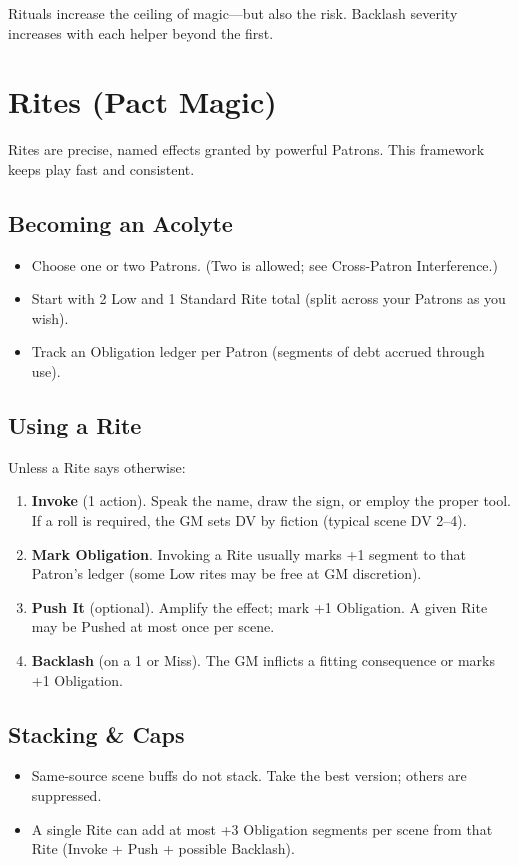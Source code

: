 Rituals increase the ceiling of magic—but also the risk. Backlash severity increases with each helper beyond the first.

\section{Rites (Pact Magic)}

Rites are precise, named effects granted by powerful Patrons. This framework keeps play fast and consistent.

\subsection*{Becoming an Acolyte}
\begin{itemize}
    \item Choose one or two Patrons. (Two is allowed; see Cross-Patron Interference.)
    \item Start with 2 Low and 1 Standard Rite total (split across your Patrons as you wish).
    \item Track an Obligation ledger per Patron (segments of debt accrued through use).
\end{itemize}

\subsection*{Using a Rite}
Unless a Rite says otherwise:
\begin{enumerate}
    \item \textbf{Invoke} (1 action). Speak the name, draw the sign, or employ the proper tool. If a roll is required, the GM sets DV by fiction (typical scene DV 2–4).
    \item \textbf{Mark Obligation}. Invoking a Rite usually marks +1 segment to that Patron's ledger (some Low rites may be free at GM discretion).
    \item \textbf{Push It} (optional). Amplify the effect; mark +1 Obligation. A given Rite may be Pushed at most once per scene.
    \item \textbf{Backlash} (on a 1 or Miss). The GM inflicts a fitting consequence or marks +1 Obligation.
\end{enumerate}

\subsection*{Stacking \& Caps}
\begin{itemize}
    \item Same-source scene buffs do not stack. Take the best version; others are suppressed.
    \item A single Rite can add at most +3 Obligation segments per scene from that Rite (Invoke + Push + possible Backlash).
\end{itemize}

